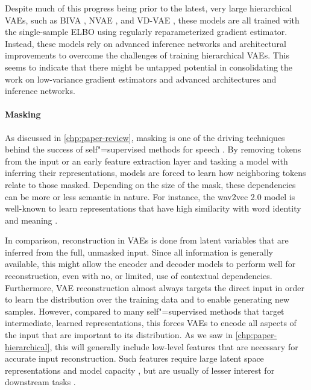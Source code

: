 Despite much of this progress being prior to the latest, very large hierarchical VAEs, such as BIVA \parencite{maaloe_biva_2019}, NVAE \parencite{vahdat_nvae_2020}, and VD-VAE \parencite{child_very_2021}, these models are all trained with the single-sample ELBO using regularly reparameterized gradient estimator. Instead, these models rely on advanced inference networks \parencite{maaloe_biva_2019} and architectural improvements \parencite{vahdat_nvae_2020, child_very_2021} to overcome the challenges of training hierarchical VAEs. 
This seems to indicate that there might be untapped potential in consolidating the work on low-variance gradient estimators and advanced architectures and inference networks.


\paragraph{Masking} 
As discussed in \cref{chp:paper-review}, masking is one of the driving techniques behind the success of self"=supervised methods for speech \parencite{devlin_bert_2018,baevski_wav2vec_2020}. By removing tokens from the input or an early feature extraction layer and tasking a model with inferring their representations, models are forced to learn how neighboring tokens relate to those masked. Depending on the size of the mask, these dependencies can be more or less semantic in nature. For instance, the wav2vec 2.0 model is well-known to learn representations that have high similarity with word identity and meaning \parencite{pasad_layerwise_2021}. 

In comparison, reconstruction in VAEs is done from latent variables that are inferred from the full, unmasked input. Since all information is generally available, this might allow the encoder and decoder models to perform well for reconstruction, even with no, or limited, use of contextual dependencies. Furthermore, VAE reconstruction almost always targets the direct input in order to learn the distribution over the training data and to enable generating new samples. However, compared to many self"=supervised methods that target intermediate, learned representations, this forces VAEs to encode all aspects of the input that are important to its distribution. As we saw in \cref{chp:paper-hierarchical}, this will generally include low-level features that are necessary for accurate input reconstruction. Such features require large latent space representations and model capacity \parencite{vahdat_nvae_2020,child_very_2021}, but are usually of lesser interest for downstream tasks \parencite{baevski_wav2vec_2020}.

